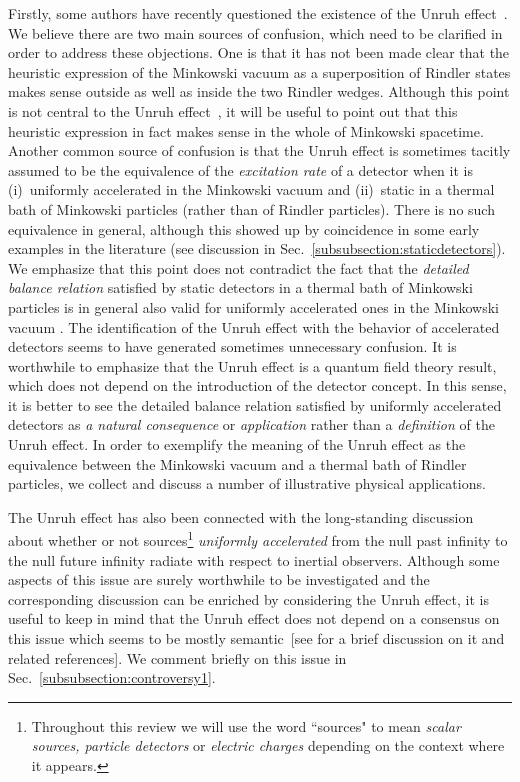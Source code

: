 \documentclass[12pt,nofootinbib,floatfix,aps,prd,showpacs,amsmath,amssymb,eqsecnum]{revtex4-2}
\begin{document}
Firstly, some authors have recently questioned the existence of the
Unruh effect~\cite{Belinskiietal02, Belinskiietal04}. 
We believe there are two main sources of confusion,
which need to be clarified in order to address these objections.
One is that it has not been 
made clear that the heuristic expression of the Minkowski
vacuum as a superposition of Rindler states makes sense outside as well
as inside the two Rindler wedges.
Although this point is not central to the Unruh
effect~\cite{rebuttal}, it will be useful to point out that this
heuristic expression in fact makes sense in the whole of Minkowski
spacetime. 
Another common source of confusion is that the 
Unruh effect is sometimes tacitly assumed to be the equivalence 
of the {\em excitation rate} of a detector when it is 
(i)~uniformly accelerated in the Minkowski vacuum and 
(ii)~static in a thermal bath of Minkowski particles 
(rather than of Rindler particles). There is no such equivalence 
in general, although this showed up by coincidence in some early 
examples in the literature 
(see discussion in Sec.~\ref{subsubsection:staticdetectors}). 
We emphasize that this point does not contradict 
the fact that the {\em detailed balance relation} 
satisfied by static detectors in a thermal bath of Minkowski particles 
is in general also valid for uniformly accelerated ones in the Minkowski 
vacuum \cite{Unruh76}. The identification of 
the Unruh effect with the behavior of accelerated detectors 
seems to have generated sometimes unnecessary confusion. It is 
worthwhile to emphasize that the Unruh effect is a quantum 
field theory result, which does not depend on the introduction 
of the detector concept. In this sense, it is better to see the 
detailed balance relation satisfied by uniformly accelerated 
detectors as {\em a natural consequence} or {\em application}
rather than a {\em definition} of the Unruh effect. In order to 
exemplify the meaning of the Unruh effect  as the equivalence 
between the Minkowski vacuum and a thermal bath of Rindler 
particles, we collect and discuss a number of illustrative 
physical applications.

The Unruh effect has also been connected with the long-standing 
discussion about whether or not 
sources\footnote{Throughout this review we will use the word ``sources" 
to mean {\em scalar sources, particle detectors} or 
{\em electric charges} depending on the context where it appears.} 
{\em uniformly accelerated} 
from the null past infinity to the null future infinity radiate 
with respect to inertial observers. Although some aspects of this 
issue are surely worthwhile to be investigated and the corresponding 
discussion can be enriched by considering the Unruh 
effect, it is useful to keep in mind that the Unruh effect 
does not depend on a consensus on this issue which seems to be mostly 
semantic~[see \textcite{Fulling05} for a brief discussion on it 
and related references]. We comment briefly on this issue in 
Sec.~\ref{subsubsection:controversy1}. 
\end{document}
